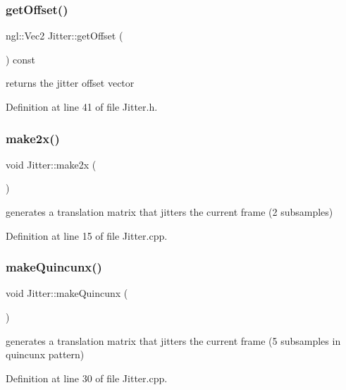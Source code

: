 \subsubsection{getOffset()}
{\footnotesize\ttfamily ngl\+::\+Vec2 Jitter\+::get\+Offset (\begin{DoxyParamCaption}{ }\end{DoxyParamCaption}) const\hspace{0.3cm}{\ttfamily [inline]}}



returns the jitter offset vector 



Definition at line 41 of file Jitter.\+h.

\mbox{\label{class_jitter_a082c09130e20efe60163d50fab9e56c7}} 
\subsubsection{make2x()}
{\footnotesize\ttfamily void Jitter\+::make2x (\begin{DoxyParamCaption}{ }\end{DoxyParamCaption})}



generates a translation matrix that jitters the current frame (2 subsamples) 



Definition at line 15 of file Jitter.\+cpp.

\mbox{\label{class_jitter_ae49d79bb19617b8c6b45ed841d7a47ab}} 
\subsubsection{makeQuincunx()}
{\footnotesize\ttfamily void Jitter\+::make\+Quincunx (\begin{DoxyParamCaption}{ }\end{DoxyParamCaption})}



generates a translation matrix that jitters the current frame (5 subsamples in quincunx pattern) 



Definition at line 30 of file Jitter.\+cpp.

\mbox{\label{class_jitter_ad04d34a1f66b32208eec994949d0004c}} 
